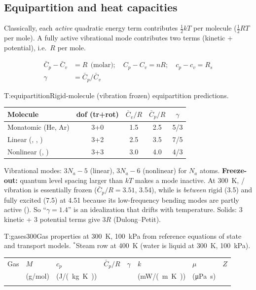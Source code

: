 \begin{multicols}{2}
\subsection{Equipartition and heat capacities}\label{sec:equipartition}
\CORE{} Classically, each \emph{active} quadratic energy term contributes $\tfrac12kT$ per molecule ($\tfrac12RT$ per mole). A fully active vibrational mode contributes two terms (kinetic + potential), i.e.\ $R$ per mole.
\begin{formulabox}
\vspace{-6pt}
\begin{align}
\bar C_p-\bar C_v &= R\ \ \text{(molar)};\quad C_p-C_v=nR;\quad c_p-c_v=R_s \label{F:gas:mayer}\\
\gamma &= \bar C_p/\bar C_v \label{F:gas:gamma}
\end{align}
\end{formulabox}
\begin{reftab}{T:equipartition}{Rigid-molecule (vibration frozen) equipartition predictions.}
\small
\begin{tabularx}{\linewidth}{@{}Ycccc@{}}
\toprule
Molecule & dof (tr+rot) & $\bar C_v/R$ & $\bar C_p/R$ & $\gamma$\\
\midrule
Monatomic (He, Ar) & 3+0 & 1.5 & 2.5 & 5/3\\
Linear (, , ) & 3+2 & 2.5 & 3.5 & 7/5\\
Nonlinear (, ) & 3+3 & 3.0 & 4.0 & 4/3\\
\bottomrule
\end{tabularx}\end{reftab}
Vibrational modes: $3N_a-5$ (linear), $3N_a-6$ (nonlinear) for $N_a$ atoms. \textbf{Freeze-out:} quantum level spacing larger than $kT$ makes a mode inactive. At \SI{300}{K}, / vibration is essentially frozen ($\bar C_p/R=3.51$, 3.54), while  is \emph{between} rigid (3.5) and fully excited (7.5) at 4.51 because its low-frequency bending modes are partly active (). So ``$\gamma=1.4$'' is an idealization that drifts with temperature. Solids: 3 kinetic + 3 potential terms give $3R$ (Dulong--Petit).
\end{multicols}

\begin{reftab}{T:gases300}{Gas properties at \SI{300}{K}, \SI{100}{kPa} from reference equations of state and transport models. $^\ast$Steam row at \SI{400}{K} (water is liquid at \SI{300}{K}, \SI{100}{kPa}).}
\small
\begin{tabularx}{\textwidth}{@{}lYYYYYYY@{}}
\toprule
Gas & $M$ & $c_p$ & $\bar C_p/R$ & $\gamma$ & $k$ & $\mu$ & $Z$\\
 & (\si{g/mol}) & (\si{J/(kg.K)}) & & & (\si{mW/(m.K)}) & (\si{\micro Pa.s}) & \\
\midrule
{}
\bottomrule
\end{tabularx}\end{reftab}

